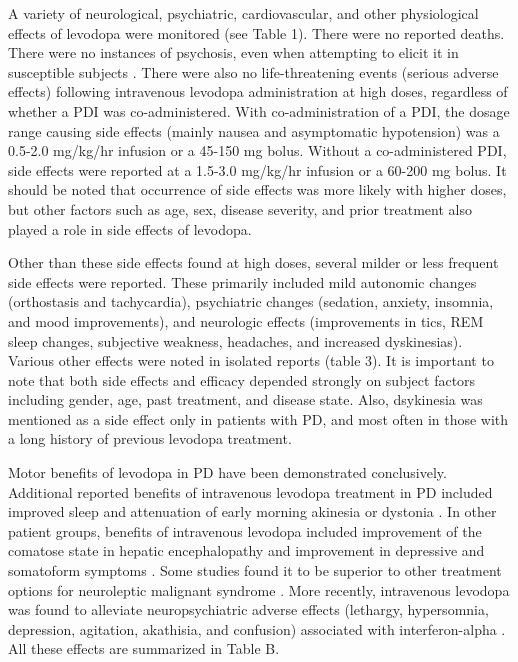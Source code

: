 A variety of neurological, psychiatric, cardiovascular, and other physiological effects of levodopa  were monitored (see Table 1). There were no reported deaths.  There were no instances of psychosis, even when attempting to elicit it in susceptible subjects \cite{9748031}.  There were also no life-threatening events (serious adverse effects) following intravenous levodopa administration at high doses, regardless of whether a PDI was co-administered.  With co-administration of a PDI, the dosage range causing side effects (mainly nausea and asymptomatic hypotension) was a 0.5-2.0 mg/kg/hr infusion or a 45-150 mg bolus.  Without a co-administered PDI, side effects were reported at a 1.5-3.0 mg/kg/hr infusion or a 60-200 mg bolus. It should be noted that occurrence of side effects was more likely with higher doses, but other factors such as age, sex, disease severity, and prior treatment also played a role in side effects of levodopa.  

Other than these side effects found at high doses, several milder or less frequent side effects were reported. These primarily included mild autonomic changes (orthostasis and tachycardia), psychiatric changes (sedation, anxiety, insomnia, and mood improvements), and neurologic effects (improvements in tics, REM sleep changes, subjective weakness, headaches, and increased dyskinesias). Various other effects were noted in isolated reports (table 3). It is important to note that both side effects and efficacy depended strongly on subject factors including gender, age, past treatment, and disease state.  Also, dsykinesia was mentioned as a side effect only in patients with PD, and most often in those with a long history of previous levodopa treatment. 

Motor benefits of levodopa in PD have been demonstrated conclusively. Additional reported benefits of intravenous levodopa treatment in PD included improved sleep \cite{6722513} and attenuation of early morning akinesia or dystonia \cite{3601092}.  In other patient groups, benefits of intravenous levodopa included improvement of the comatose state in hepatic encephalopathy \cite{4544184} and improvement in depressive and somatoform symptoms \cite{5898634}.  Some studies found it to be superior to other treatment options for neuroleptic malignant syndrome \cite{9099421}.  More recently, intravenous levodopa was found to alleviate neuropsychiatric adverse effects (lethargy, hypersomnia, depression, agitation, akathisia, and confusion) associated with interferon-alpha \cite{10682234}. All these effects are summarized in Table B.
  